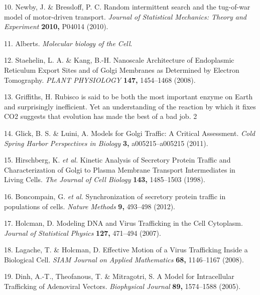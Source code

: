 \documentclass{Dissertate}
\begin{document}
\leavevmode\hypertarget{ref-newby_random_2010}{}%
10. Newby, J. \& Bressloff, P. C. Random intermittent search and the
tug-of-war model of motor-driven transport. \emph{Journal of Statistical
Mechanics: Theory and Experiment} \textbf{2010,} P04014 (2010).

\leavevmode\hypertarget{ref-alberts_molecular_nodate}{}%
11. Alberts. \emph{Molecular biology of the Cell}.

\leavevmode\hypertarget{ref-staehelin_nanoscale_2008}{}%
12. Staehelin, L. A. \& Kang, B.-H. Nanoscale Architecture of
Endoplasmic Reticulum Export Sites and of Golgi Membranes as Determined
by Electron Tomography. \emph{PLANT PHYSIOLOGY} \textbf{147,} 1454--1468
(2008).

\leavevmode\hypertarget{ref-griffiths_rubisco_nodate}{}%
13. Griffiths, H. Rubisco is said to be both the most important enzyme
on Earth and surprisingly inefficient. Yet an understanding of the
reaction by which it fixes CO2 suggests that evolution has made the best
of a bad job. 2

\leavevmode\hypertarget{ref-glick_models_2011}{}%
14. Glick, B. S. \& Luini, A. Models for Golgi Traffic: A Critical
Assessment. \emph{Cold Spring Harbor Perspectives in Biology}
\textbf{3,} a005215--a005215 (2011).

\leavevmode\hypertarget{ref-hirschberg_kinetic_1998}{}%
15. Hirschberg, K. \emph{et al.} Kinetic Analysis of Secretory Protein
Traffic and Characterization of Golgi to Plasma Membrane Transport
Intermediates in Living Cells. \emph{The Journal of Cell Biology}
\textbf{143,} 1485--1503 (1998).

\leavevmode\hypertarget{ref-boncompain_synchronization_2012}{}%
16. Boncompain, G. \emph{et al.} Synchronization of secretory protein
traffic in populations of cells. \emph{Nature Methods} \textbf{9,}
493--498 (2012).

\leavevmode\hypertarget{ref-holcman_modeling_2007}{}%
17. Holcman, D. Modeling DNA and Virus Trafficking in the Cell
Cytoplasm. \emph{Journal of Statistical Physics} \textbf{127,} 471--494
(2007).

\leavevmode\hypertarget{ref-lagache_effective_2008}{}%
18. Lagache, T. \& Holcman, D. Effective Motion of a Virus Trafficking
Inside a Biological Cell. \emph{SIAM Journal on Applied Mathematics}
\textbf{68,} 1146--1167 (2008).

\leavevmode\hypertarget{ref-dinh_model_2005}{}%
19. Dinh, A.-T., Theofanous, T. \& Mitragotri, S. A Model for
Intracellular Trafficking of Adenoviral Vectors. \emph{Biophysical
Journal} \textbf{89,} 1574--1588 (2005).
\end{document}
